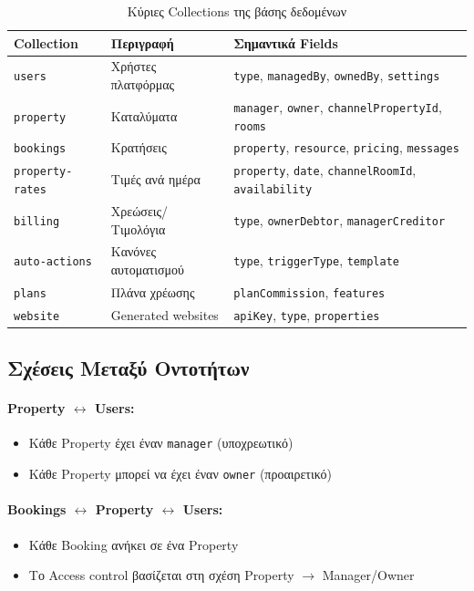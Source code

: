 \documentclass[
	12pt, %
	oneside, %
	greek,
	onehalfspacing, %
	liststotoc, %
	toctotoc, %
	parskip, %
	headsepline, %
]{MastersDoctoralThesis} %
\newcommand{\code}[1]{\texttt{#1}}
\begin{document}
\begin{table}[H]
\centering
\caption{Κύριες Collections της βάσης δεδομένων}
\label{tab:collections}
\begin{tabular}{@{}L{2.5cm}L{3.5cm}L{6cm}@{}}
\toprule
\textbf{Collection} & \textbf{Περιγραφή} & \textbf{Σημαντικά Fields} \\
\midrule
\code{users} & Χρήστες πλατφόρμας & \code{type}, \code{managedBy}, \code{ownedBy}, \code{settings} \\
\code{property} & Καταλύματα & \code{manager}, \code{owner}, \code{channelPropertyId}, \code{rooms} \\
\code{bookings} & Κρατήσεις & \code{property}, \code{resource}, \code{pricing}, \code{messages} \\
\code{property-rates} & Τιμές ανά ημέρα & \code{property}, \code{date}, \code{channelRoomId}, \code{availability} \\
\code{billing} & Χρεώσεις/Τιμολόγια & \code{type}, \code{ownerDebtor}, \code{managerCreditor} \\
\code{auto-actions} & Κανόνες αυτοματισμού & \code{type}, \code{triggerType}, \code{template} \\
\code{plans} & Πλάνα χρέωσης & \code{planCommission}, \code{features} \\
\code{website} & Generated websites & \code{apiKey}, \code{type}, \code{properties} \\
\bottomrule
\end{tabular}
\end{table}

\subsection{Σχέσεις Μεταξύ Οντοτήτων}
\label{subsec:entity-relations}

\paragraph{Property $\leftrightarrow$ Users:}
\begin{itemize}
    \item Κάθε Property έχει έναν \code{manager} (υποχρεωτικό)
    \item Κάθε Property μπορεί να έχει έναν \code{owner} (προαιρετικό)
\end{itemize}

\paragraph{Bookings $\leftrightarrow$ Property $\leftrightarrow$ Users:}
\begin{itemize}
    \item Κάθε Booking ανήκει σε ένα Property
    \item Το Access control βασίζεται στη σχέση Property $\rightarrow$ Manager/Owner
\end{itemize}
\end{document}
